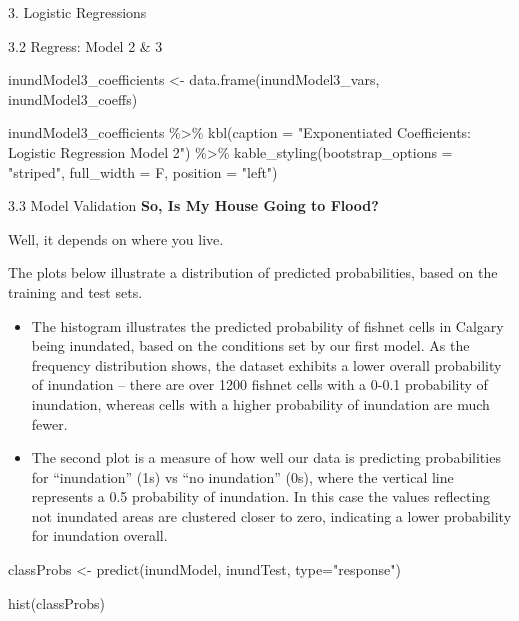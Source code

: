 \documentclass[
  ignorenonframetext,
]{beamer}
\newenvironment{Shaded}{\begin{snugshade}}{\end{snugshade}}
\newcommand{\AttributeTok}[1]{\textcolor[rgb]{0.77,0.63,0.00}{#1}}
\newcommand{\FunctionTok}[1]{\textcolor[rgb]{0.00,0.00,0.00}{#1}}
\newcommand{\NormalTok}[1]{#1}
\newcommand{\OtherTok}[1]{\textcolor[rgb]{0.56,0.35,0.01}{#1}}
\newcommand{\SpecialCharTok}[1]{\textcolor[rgb]{0.00,0.00,0.00}{#1}}
\newcommand{\StringTok}[1]{\textcolor[rgb]{0.31,0.60,0.02}{#1}}
\begin{document}
\begin{frame}[fragile]{3. Logistic Regressions}
\begin{block}{3.2 Regress: Model 2 \& 3}
\begin{Shaded}
\begin{Highlighting}[]
\NormalTok{inundModel3\_coefficients }\OtherTok{\textless{}{-}} \FunctionTok{data.frame}\NormalTok{(inundModel3\_vars, inundModel3\_coeffs)}

\NormalTok{inundModel3\_coefficients }\SpecialCharTok{\%\textgreater{}\%} 
  \FunctionTok{kbl}\NormalTok{(}\AttributeTok{caption =} \StringTok{"Exponentiated Coefficients: Logistic Regression Model 2"}\NormalTok{) }\SpecialCharTok{\%\textgreater{}\%} 
   \FunctionTok{kable\_styling}\NormalTok{(}\AttributeTok{bootstrap\_options =} \StringTok{"striped"}\NormalTok{, }\AttributeTok{full\_width =}\NormalTok{ F, }\AttributeTok{position =} \StringTok{"left"}\NormalTok{)}
\end{Highlighting}
\end{Shaded}
\end{block}

\begin{block}{3.3 Model Validation}
\protect\hypertarget{model-validation}{}
\textbf{So, Is My House Going to Flood?}

Well, it depends on where you live.

The plots below illustrate a distribution of predicted probabilities,
based on the training and test sets.

\begin{itemize}
\item
  The histogram illustrates the predicted probability of fishnet cells
  in Calgary being inundated, based on the conditions set by our first
  model. As the frequency distribution shows, the dataset exhibits a
  lower overall probability of inundation -- there are over 1200 fishnet
  cells with a 0-0.1 probability of inundation, whereas cells with a
  higher probability of inundation are much fewer.
\item
  The second plot is a measure of how well our data is predicting
  probabilities for ``inundation'' (1s) vs ``no inundation'' (0s), where
  the vertical line represents a 0.5 probability of inundation. In this
  case the values reflecting not inundated areas are clustered closer to
  zero, indicating a lower probability for inundation overall.
\end{itemize}

\begin{Shaded}
\begin{Highlighting}[]
\NormalTok{classProbs }\OtherTok{\textless{}{-}} \FunctionTok{predict}\NormalTok{(inundModel, inundTest, }\AttributeTok{type=}\StringTok{"response"}\NormalTok{)}


\FunctionTok{hist}\NormalTok{(classProbs)}
\end{Highlighting}
\end{Shaded}


\end{block}
\end{frame}
\end{document}
